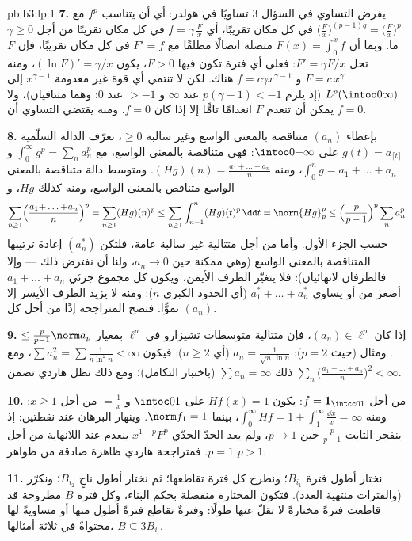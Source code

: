 \begin{solution}{pb:b3:lp:1}
\textbf{7.} يفرض التساوي في السؤال 3 تساويًا في هولدر: أي أن
يتناسب $f^p$ مع $\bigl(\frac Fx\bigr)^{(p-1)q}
= \bigl(\frac Fx\bigr)^p$ في كل مكان تقريبًا، أي $f = \gamma\,\frac Fx$ في كل
مكان تقريبًا من أجل $\gamma \geq 0$ ما. وبما أن $F(x) = \int_0^xf$ متصلة
اتصالًا مطلقًا مع $F' = f$ في كل مكان تقريبًا، فإن $F$ تحل
$F' =
\gamma F/x$: فعلى أي فترة تكون فيها $F > 0$، يكون $(\ln F)' =
\gamma/x$، ومنه
$F = c\,x^{\gamma}$ و $f = c\gamma
x^{\gamma - 1}$ هناك. لكن لا تنتمي أي قوة غير معدومة
$x^{\gamma-1}$ إلى $L^p(\intoo0\infty)$ (إذ يلزم $p(\gamma - 1) < -1$ عند $\infty$
و $> -1$ عند $0$: وهما متنافيان)، ولا يمكن أن تنعدم $F$ انعدامًا
تامًّا إلا إذا كان $f = 0$. ومنه يقتضي التساوي أن $f =
0$.

\textbf{8.} بإعطاء $(a_n)$ متناقصة بالمعنى الواسع وغير سالبة $\geq 0$،
نعرّف الدالة السلّمية $g(t) = a_{\lceil t\rceil}$ على $\intoo0{+\infty}$: فهي متناقصة بالمعنى
الواسع، مع $\int_0^\infty g^p =
\sum_na_n^p$ و $\int_0^ng = a_1 + \dots + a_n$، ومنه $(Hg)(n) = \frac{a_1 + \dots + a_n}n$. ومتوسط دالة متناقصة
بالمعنى الواسع متناقص بالمعنى الواسع، ومنه كذلك $Hg$، و
\[
\sum_{n\geq1}\Bigl(\frac{a_1{+}\dots{+}a_n}n\Bigr)^p
= \sum_{n\geq1}(Hg)(n)^p
\leq \sum_{n\geq1}\int_{n-1}^n (Hg)(t)^p\,\dd t
= \norm{Hg}_p^p
\leq \Bigl(\frac p{p-1}\Bigr)^p\sum_n a_n^p
\]
حسب الجزء الأول. وأما من أجل متتالية غير سالبة عامة، فلتكن
$(a_n^*)$ إعادةَ ترتيبها المتناقصة بالمعنى الواسع (وهي ممكنة
حين $a_n \to 0$، ولنا أن نفترض ذلك --- وإلا فالطرفان لانهائيان):
فلا يتغيّر الطرف الأيمن، ويكون كل مجموع جزئي $a_1 + \dots
+ a_n$ أصغر من
أو يساوي $a_1^* + \dots + a_n^*$ (أي الحدود الكبرى $n$): ومنه لا يزيد الطرف
الأيسر إلا نموًّا. فتصح المتراجحة إذًا من أجل كل $(a_n)$.

\textbf{9.} إذا كان $(a_n) \in \ell^p$، فإن متتالية متوسطات تشيزارو في
$\ell^p$ بمعيار $\leq \frac p{p-1}\norm
a_p$. ومثال (حيث $p = 2$): $a_n = \frac1{\sqrt n\,\ln n}$ (أي
$n
\geq 2$): فيكون $\sum a_n^2 = \sum\frac1{n\ln^2n} < \infty$، ومع ذلك $\sum a_n = \infty$ (باختبار التكامل)؛
ومع ذلك تظل هاردي تضمن $\sum_n\bigl(\frac{a_1 + \dots + a_n}n\bigr)^2 < \infty$.

\textbf{10.} من أجل $f = \mathbf 1_{\intcc01}$: يكون $Hf(x) = 1$ على $\intoc01$
و $= \frac1x$ من أجل $x \geq 1$: ومنه $\int_0^\infty Hf =
1 + \int_1^\infty\frac{\dd x}x = \infty$، بينما $\norm f_1 =
1$.
وينهار البرهان عند نقطتين: إذ ينفجر الثابت $\frac p{p-1}$ حين
$p \to 1$، ولم يعد الحدّ الحدّي $x^{1-p}F^p$ ينعدم عند اللانهاية
من أجل $p = 1$. فمتراجحة هاردي ظاهرة صادقة من ظواهر $p > 1$.

\textbf{11.} نختار أطول فترة $B_{i_1}$؛ ونطرح كل فترة تقاطعها؛
ثم نختار أطول ناجٍ $B_{i_2}$؛ ونكرّر (والفترات منتهية العدد).
فتكون المختارة منفصلة بحكم البناء، وكل فترة $B$ مطروحة قد قاطعت
فترةً مختارةً لا تقلّ عنها طولًا: وفترةٌ تقاطع فترةً أطول منها
أو مساويةً لها محتواةٌ في ثلاثة أمثالها، $B \subseteq
3B_{i_l}$.


\end{solution}
